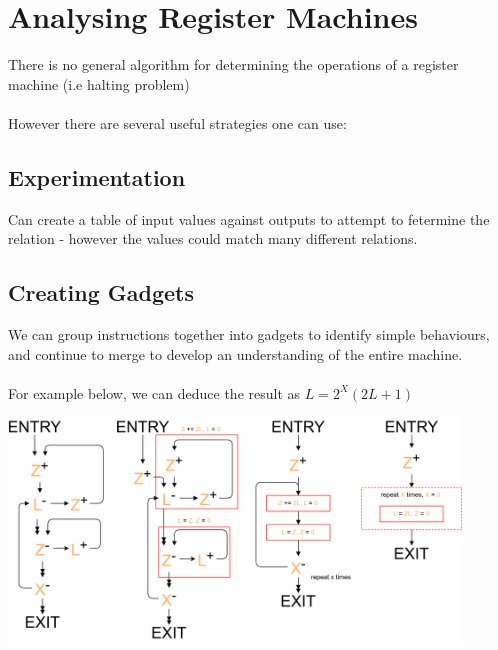 \section{Analysing Register Machines}
There is no general algorithm for determining the operations of a register machine (i.e halting problem)
\\
\\ However there are several useful strategies one can use:

\subsection{Experimentation}
Can create a table of input values against outputs to attempt to fetermine the relation - however the values could match many different relations.

\subsection{Creating Gadgets}
We can group instructions together into gadgets to identify simple behaviours, and continue to merge to develop an understanding of the entire machine.
\\
\\ For example below, we can deduce the result as $L = 2^X(2L + 1)$
\begin{center}
	\includegraphics[width=0.9\textwidth]{register_machines/images/rm_analysis.drawio.png}
\end{center}

